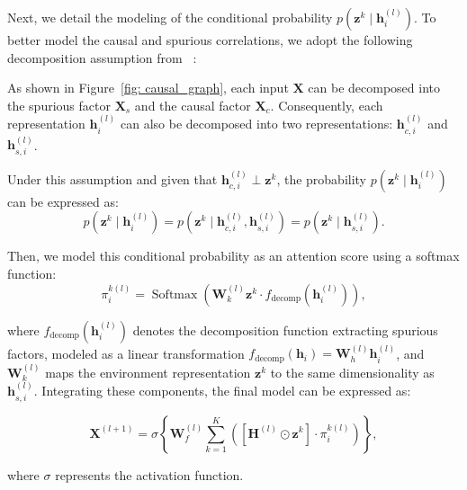 Next, we detail the modeling of the conditional probability \( p(\mathbf{z}^k \mid \mathbf{h}_i^{(l)}) \). To better model the causal and spurious correlations, we adopt the following decomposition assumption from ~\cite{mao2022causal}:
 
\begin{assumption}
As shown in Figure~\ref{fig: causal_graph}, each input $\mathbf{X}$ can be decomposed into the spurious factor $\mathbf{X}_s$ and the causal factor $\mathbf{X}_c$. Consequently, each representation \( \mathbf{h}_i^{(l)} \) can also be decomposed into two representations:  \( \mathbf{h}_{c,i}^{(l)} \) and \( \mathbf{h}_{s,i}^{(l)} \).
\end{assumption} 

Under this assumption and given that \( \mathbf{h}_{c,i}^{(l)} \perp \mathbf{z}^k \), the probability \( p(\mathbf{z}^k \mid \mathbf{h}_i^{(l)}) \) can be expressed as:
\[
p(\mathbf{z}^k \mid \mathbf{h}_i^{(l)}) = p(\mathbf{z}^k \mid \mathbf{h}_{c,i}^{(l)}, \mathbf{h}_{s,i}^{(l)}) = p(\mathbf{z}^k \mid \mathbf{h}_{s,i}^{(l)}). \tag{9}
\]

Then, we model this conditional probability as an attention score using a softmax function:
\[
\label{eq11}
\pi_i^{k(l)} = \operatorname{Softmax} \left( \mathbf{W}_k^{(l)} \mathbf{z}^k \cdot f_{\text{decomp}}(\mathbf{h}_i^{(l)}) \right), \tag{10}
\]

where \( f_{\text{decomp}}(\mathbf{h}_i^{(l)}) \) denotes the decomposition function extracting spurious factors, modeled as a linear transformation \( f_{\text{decomp}}(\mathbf{h}_i) = \mathbf{W}_h^{(l)} \mathbf{h}_i^{(l)} \), and \( \mathbf{W}_k^{(l)} \) maps the environment representation \( \mathbf{z}^k \) to the same dimensionality as \( \mathbf{h}_{s, i}^{(l)} \). Integrating these components, the final model can be expressed as:

\[
\mathbf{X}^{(l+1)} = \sigma \left\{ \mathbf{W}_f^{(l)} \sum_{k=1}^{K} \left( [\mathbf{H}^{(l)} \odot \mathbf{z}^k] \cdot \pi_i^{k(l)} \right) \right\}, \tag{11}
\]

where \( \sigma \) represents the activation function.



